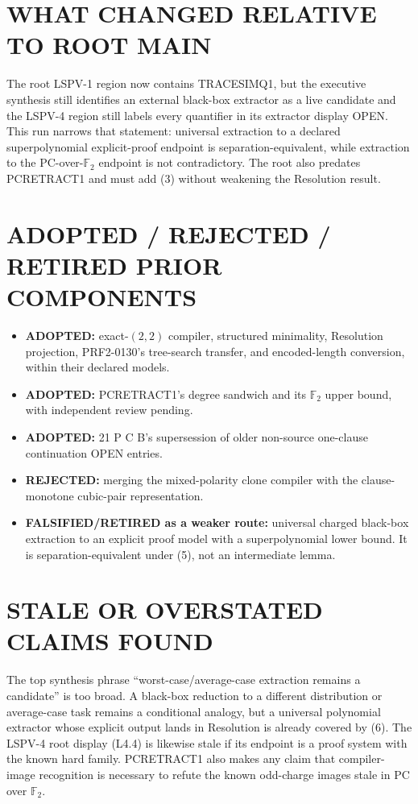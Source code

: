 \documentclass[11pt]{article}
\begin{document}
\section{WHAT CHANGED RELATIVE TO ROOT MAIN}
The root LSPV-1 region now contains TRACESIMQ1, but the executive synthesis
still identifies an external black-box extractor as a live candidate and the
LSPV-4 region still labels every quantifier in its extractor display OPEN.
This run narrows that statement: universal extraction to a declared
superpolynomial explicit-proof endpoint is separation-equivalent, while
extraction to the PC-over-$\mathbb F_2$ endpoint is not contradictory.
The root also predates PCRETRACT1 and must add (3) without weakening the
Resolution result.

\section{ADOPTED / REJECTED / RETIRED PRIOR COMPONENTS}
\begin{itemize}
\item \textbf{ADOPTED:} exact-$(2,2)$ compiler, structured minimality,
Resolution projection, PRF2-0130's tree-search transfer, and encoded-length
conversion, within their declared models.
\item \textbf{ADOPTED:} PCRETRACT1's degree sandwich and its $\mathbb F_2$
upper bound, with independent review pending.
\item \textbf{ADOPTED:} 21 P C B's supersession of older non-source
one-clause continuation OPEN entries.
\item \textbf{REJECTED:} merging the mixed-polarity clone compiler with the
clause-monotone cubic-pair representation.
\item \textbf{FALSIFIED/RETIRED as a weaker route:} universal charged
black-box extraction to an explicit proof model with a superpolynomial lower
bound.  It is separation-equivalent under (5), not an intermediate lemma.
\end{itemize}

\section{STALE OR OVERSTATED CLAIMS FOUND}
The top synthesis phrase ``worst-case/average-case extraction remains a
candidate'' is too broad.  A black-box reduction to a different distribution
or average-case task remains a conditional analogy, but a universal
polynomial extractor whose explicit output lands in Resolution is already
covered by (6).  The LSPV-4 root display (L4.4) is likewise stale if its
endpoint is a proof system with the known hard family.  PCRETRACT1 also makes
any claim that compiler-image recognition is necessary to refute the known
odd-charge images stale in PC over $\mathbb F_2$.
\end{document}
